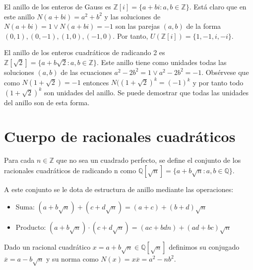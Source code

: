 \begin{example}
El anillo de los enteros de Gauss es $\mathbb{Z}[i] = \{a+bi:a,b \in \mathbb{Z}\}$. Está claro que en este anillo $N(a+bi) = a^2 + b^2$ y las soluciones de $N(a+bi) = 1 \lor N(a+bi) = -1$ son las parejas $(a,b)$ de la forma $(0,1),(0,-1),(1,0),(-1,0)$. Por tanto, $U(\mathbb{Z}[i]) = \{1,-1,i,-i\}$. 

\begin{figure}[H]
\centering
{}
\end{figure}

El anillo de los enteros cuadráticos de radicando 2 es $\mathbb{Z}[\sqrt{2}] = \{a+b\sqrt{2}:a,b \in \mathbb{Z}\}$. Este anillo tiene como unidades todas las soluciones $(a,b)$ de las ecuaciones $a^2-2b^2 = 1 \lor a^2-2b^2 = -1$. Obsérvese que como $N(1+ \sqrt{2}) = -1$ entonces $N((1+\sqrt{2})^k = (-1)^k$ y por tanto todo $(1+\sqrt{2})^k$ son unidades del anillo. Se puede demostrar que todas las unidades del anillo son de esta forma. 

\end{example}

\section{Cuerpo de racionales cuadráticos}

\begin{definition}
Para cada $n \in \mathbb{Z}$ que no sea un cuadrado perfecto, se define el conjunto de los racionales cuadráticos de radicando n como $\mathbb{Q}[\sqrt{n}] = \{a+b\sqrt{n}:a,b \in \mathbb{Q}\}$.

A este conjunto se le dota de estructura de anillo mediante las operaciones:

\begin{itemize}
\item Suma: $(a+b\sqrt{n})+(c+d\sqrt{n}) = (a+c) + (b+d)\sqrt{n}$
\item Producto: $(a+b\sqrt{n}) \cdot (c+d\sqrt{n}) = (ac+bdn)+(ad+bc)\sqrt{n}$
\end{itemize}

Dado un racional cuadrático $x = a + b \sqrt{n} \in \mathbb{Q}[\sqrt{n}]$ definimos su conjugado $\overline{x} = a - b \sqrt{n}$ y su norma como $N(x) = x \overline{x} = a^2-nb^2$. 
\end{definition}

